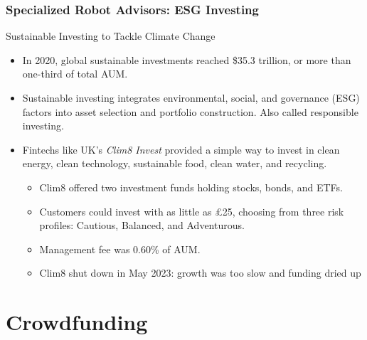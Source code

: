 \documentclass[aspectratio=169]{beamer}
\begin{document}
\begin{frame}
\frametitle{Specialized Robot Advisors: ESG Investing}


\vspace{-2mm}
Sustainable Investing to Tackle Climate Change
\begin{itemize}
    \item In 2020, global sustainable investments reached \$35.3 trillion, or more than one-third of total AUM.
    \item Sustainable investing integrates environmental, social, and governance (ESG) factors into asset selection and portfolio construction. Also called responsible investing.
    \item Fintechs like UK's \textit{Clim8 Invest} provided a simple way to invest in clean energy, clean technology, sustainable food, clean water, and recycling.
    \begin{itemize}
        \item Clim8 offered two investment funds holding stocks, bonds, and ETFs.
        \item Customers could invest with as little as £25, choosing from three risk profiles: Cautious, Balanced, and Adventurous.
        \item Management fee was 0.60\% of AUM.
        \item Clim8 shut down in May 2023: growth was too slow and funding dried up
    \end{itemize}
\end{itemize}


\end{frame} 













\section{Crowdfunding}
\end{document}
